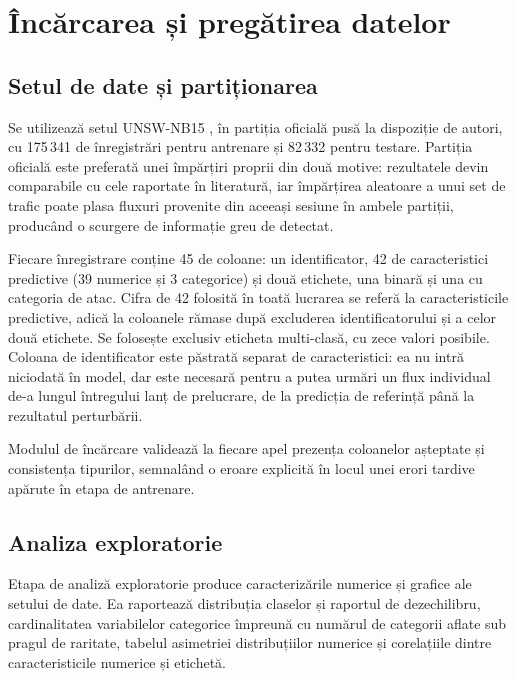 \section{Încărcarea și pregătirea datelor}\label{sec:date}

\subsection{Setul de date și partiționarea}\label{subsec:setdate}

Se utilizează setul UNSW-NB15 \cite{moustafa2015unsw}, în partiția oficială pusă la dispoziție de autori, cu 175\,341 de înregistrări pentru antrenare și 82\,332 pentru testare. Partiția oficială este preferată unei împărțiri proprii din două motive: rezultatele devin comparabile cu cele raportate în literatură, iar împărțirea aleatoare a unui set de trafic poate plasa fluxuri provenite din aceeași sesiune în ambele partiții, producând o scurgere de informație greu de detectat.

Fiecare înregistrare conține 45 de coloane: un identificator, 42 de caracteristici predictive (39 numerice și 3 categorice) și două etichete, una binară și una cu categoria de atac. Cifra de 42 folosită în toată lucrarea se referă la caracteristicile predictive, adică la coloanele rămase după excluderea identificatorului și a celor două etichete. Se folosește exclusiv eticheta multi-clasă, cu zece valori posibile. Coloana de identificator este păstrată separat de caracteristici: ea nu intră niciodată în model, dar este necesară pentru a putea urmări un flux individual de-a lungul întregului lanț de prelucrare, de la predicția de referință până la rezultatul perturbării.

Modulul de încărcare validează la fiecare apel prezența coloanelor așteptate și consistența tipurilor, semnalând o eroare explicită în locul unei erori tardive apărute în etapa de antrenare.

\subsection{Analiza exploratorie}\label{subsec:eda}

Etapa de analiză exploratorie produce caracterizările numerice și grafice ale setului de date. Ea raportează distribuția claselor și raportul de dezechilibru, cardinalitatea variabilelor categorice împreună cu numărul de categorii aflate sub pragul de raritate, tabelul asimetriei distribuțiilor numerice și corelațiile dintre caracteristicile numerice și etichetă.

